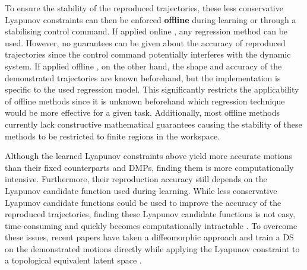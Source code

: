 To ensure the stability of the reproduced trajectories, these less conservative Lyapunov constraints can then be enforced \textbf{offline} during learning or  through a stabilising control command. If applied online \cite{khansari-zadehLearningControlLyapunov2014,umlauftLearningStableGaussian2017,umlauftUncertaintybasedControlLyapunov2018,duttaLearningStableMovement2018,umlauftUncertaintybasedHumanMotion2019,ravanbakhshFormalPolicyLearning2019,ravanbakhshLearningControlLyapunov2019,xiaoLearningStableNonparametric2020,duttaSkillLearningHuman2021,umlauftLearningStochasticallyStable2020}, any regression method can be used. However, no guarantees can be given about the accuracy of reproduced trajectories since the control command potentially interferes with the dynamic system. If applied offline \cite{neumannNeuralLearningStable2013,lemmeNeuralLearningVector2014,tesfazgiInverseReinforcementLearning2021,coulombeGeneratingStableCollisionFree2022}, on the other hand, the shape and accuracy of the demonstrated trajectories are known beforehand, but the implementation is specific to the used regression model. This significantly restricts the applicability of offline methods since it is unknown beforehand which regression technique would be more effective for a given task. Additionally, most offline methods currently lack constructive mathematical guarantees causing the stability of these methods to be restricted to finite regions in the workspace.

Although the learned Lyapunov constraints above yield more accurate motions than their fixed counterparts and DMPs, finding them is more computationally intensive. Furthermore, their reproduction accuracy still depends on the Lyapunov candidate function used during learning. While less conservative Lyapunov candidate functions could be used to improve the accuracy of the reproduced trajectories, finding these Lyapunov candidate functions is not easy, time-consuming and quickly becomes computationally intractable \cite{}. To overcome these issues, recent papers have taken a diffeomorphic approach and train a DS on the demonstrated motions directly while applying the Lyapunov constraint to a topological equivalent latent space \cite{neumannLearningRobotMotions2015,perrinFastDiffeomorphicMatching2016,jinImprovedLearningAccuracy2019,ranaEuclideanizingFlowsDiffeomorphic2020,urainImitationFlowLearningDeep2020,saverianoLearningStableRobotic2022,urainLearningStableVector2022,wangLearningDeepRobotic2022}.




